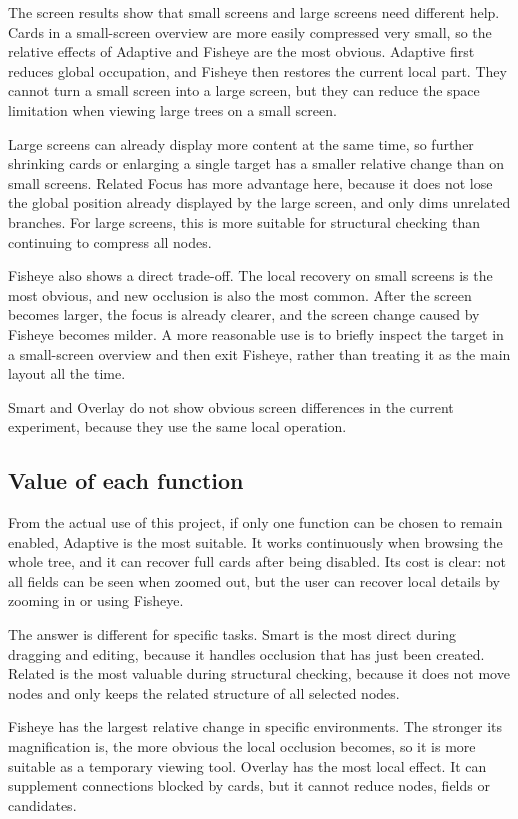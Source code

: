 \documentclass[11pt,a4paper,oneside,extrafontsizes]{memoir}
\begin{document}
The screen results show that small screens and large screens need different help. Cards in a small-screen overview are more easily compressed very small, so the relative effects of Adaptive and Fisheye are the most obvious. Adaptive first reduces global occupation, and Fisheye then restores the current local part. They cannot turn a small screen into a large screen, but they can reduce the space limitation when viewing large trees on a small screen.

Large screens can already display more content at the same time, so further shrinking cards or enlarging a single target has a smaller relative change than on small screens. Related Focus has more advantage here, because it does not lose the global position already displayed by the large screen, and only dims unrelated branches. For large screens, this is more suitable for structural checking than continuing to compress all nodes.

Fisheye also shows a direct trade-off. The local recovery on small screens is the most obvious, and new occlusion is also the most common. After the screen becomes larger, the focus is already clearer, and the screen change caused by Fisheye becomes milder. A more reasonable use is to briefly inspect the target in a small-screen overview and then exit Fisheye, rather than treating it as the main layout all the time.

Smart and Overlay do not show obvious screen differences in the current experiment, because they use the same local operation.

\subsection{Value of each function}

From the actual use of this project, if only one function can be chosen to remain enabled, Adaptive is the most suitable. It works continuously when browsing the whole tree, and it can recover full cards after being disabled. Its cost is clear: not all fields can be seen when zoomed out, but the user can recover local details by zooming in or using Fisheye.

The answer is different for specific tasks. Smart is the most direct during dragging and editing, because it handles occlusion that has just been created. Related is the most valuable during structural checking, because it does not move nodes and only keeps the related structure of all selected nodes.

Fisheye has the largest relative change in specific environments. The stronger its magnification is, the more obvious the local occlusion becomes, so it is more suitable as a temporary viewing tool. Overlay has the most local effect. It can supplement connections blocked by cards, but it cannot reduce nodes, fields or candidates.
\end{document}
